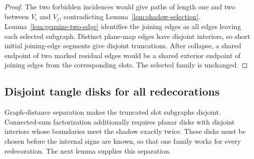 \documentclass[9pt,twoside]{pnas-new}
\theoremstyle{definition}
\theoremstyle{remark}
\begin{document}
\begin{proof}
The two forbidden incidences would give paths of length one and two between $V_i$ and $V_j$, contradicting Lemma~\ref{lem:shadow-selection}. Lemma~\ref{lem:genuine-two-edge} identifies the joining edges as all edges leaving each selected subgraph. Distinct plane-map edges have disjoint interiors, so short initial joining-edge segments give disjoint truncations. After collapse, a shared endpoint of two marked residual edges would be a shared exterior endpoint of joining edges from the corresponding slots. The selected family is unchanged.
\end{proof}

\subsection{Disjoint tangle disks for all redecorations}
Graph-distance separation makes the truncated slot subgraphs disjoint. Connected-sum factorization additionally requires planar disks with disjoint interiors whose boundaries meet the shadow exactly twice. These disks must be chosen before the internal signs are known, so that one family works for every redecoration. The next lemma supplies this separation.
\end{document}
